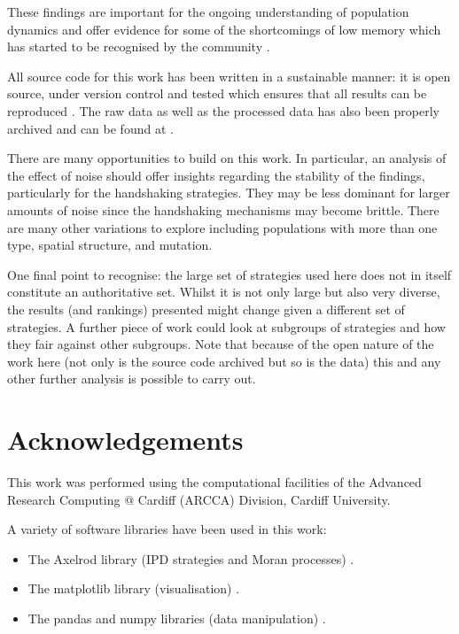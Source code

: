 \documentclass[10pt,letterpaper]{article}
\begin{document}
These findings are important for the ongoing understanding of
population dynamics and offer evidence for some of the shortcomings of low
memory which has started to be recognised by the community \cite{Hilbe2017}.

All source code for this work has been written in a sustainable manner: it is
open source, under version control and tested which ensures that all results can
be reproduced \cite{Prlic2012, Sandve2013, Wilson2014}. The raw data as well as
the processed data has also been properly archived and can be found
at \cite{data}.

There are many opportunities to build on this work. In particular, an analysis
of the effect of noise should offer insights regarding the stability of the findings,
particularly for the handshaking strategies. They may be less dominant for
larger amounts of noise since the handshaking mechanisms may become brittle.
There are many other variations to explore including populations with more
than one type, spatial structure, and mutation.

One final point to recognise: the large set of strategies used here does not in
itself constitute an authoritative set. Whilst it is not only large but also very
diverse, the results (and rankings) presented might change given a different set
of strategies. A further piece of work could look at subgroups of strategies and
how they fair against other subgroups. Note that because of the open nature of
the work here (not only is the source code archived but so is the data) this and
any other further analysis is possible to carry out.


\section*{Acknowledgements}

This work was performed using the computational facilities of the Advanced
Research Computing @ Cardiff (ARCCA) Division, Cardiff University.

A variety of software libraries have been used in this work:

\begin{itemize}
    \item The Axelrod library (IPD strategies and Moran processes)
        \cite{axelrodproject}.
    \item The matplotlib library (visualisation) \cite{hunter2007matplotlib}.
    \item The pandas and numpy libraries (data manipulation)
        \cite{mckinney2010data, walt2011numpy}.
\end{itemize}
\end{document}
